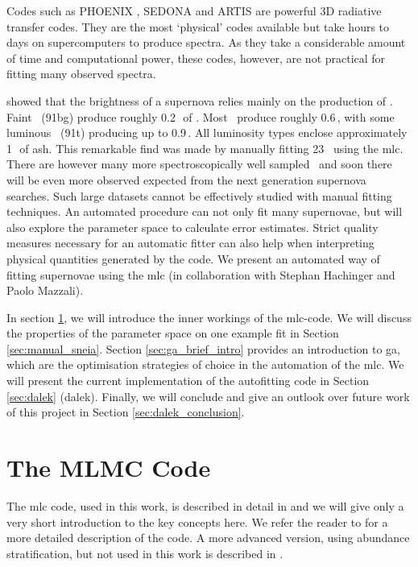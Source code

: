 Codes such as PHOENIX \cite{1999JCoAM.109...41H}, SEDONA \cite{2006ApJ...651..366K} and ARTIS \cite{2009MNRAS.398.1809K} are powerful 3D radiative transfer codes. They are the most `physical' codes available but take hours to days on supercomputers to produce spectra. As they take a considerable amount of time and computational power, these codes, however, are not practical for fitting many observed spectra.

 \cite{2007Sci...315..825M} showed that the brightness of a supernova relies mainly on the production of \Ni. Faint \sneia\ (\gls{91bg}) produce roughly 0.2\,\msun\ of \Ni. Most \sneia\ produce roughly 0.6\,\msun, with some luminous \sneia\ (\gls{91t}) producing up to 0.9\,\msun. All luminosity types enclose approximately 1\,\msun\ of ash. This remarkable find was made by manually fitting 23 \sneia\ using the \gls{mlc}. There are however many more spectroscopically well sampled \sneia\ and soon there will be even more observed expected from the next generation supernova searches. Such large datasets cannot be effectively studied with manual fitting techniques. An automated procedure can not only fit many supernovae, but will also explore the parameter space to calculate error estimates. Strict quality measures necessary for an automatic fitter can also help when interpreting physical quantities generated by the code. We present an automated way of fitting supernovae using the  \gls{mlc} (in collaboration with Stephan Hachinger and Paolo Mazzali).

In section \ref{sec:mlc_intro}, we will introduce the inner workings of the \gls{mlc}-code.  We will discuss the properties of the parameter space on one example fit in Section \ref{sec:manual_sneia}. Section \ref{sec:ga_brief_intro} provides an introduction to \gls{ga}, which are the optimisation strategies of choice in the automation of the \gls{mlc}.  We will present the current implementation of the autofitting code in Section \ref{sec:dalek} (\gls{dalek}).  Finally, we will conclude and give an outlook over future work of this project in Section \ref{sec:dalek_conclusion}.

\section{The MLMC Code}
\label{sec:mlc_intro}

The \gls{mlc} code, used in this work, is described in detail in \citet{2000A&A...363..705M} and we will give only a very short introduction to the key concepts here. We refer the reader to \citet{2000A&A...363..705M} for a more detailed description of the code. A more advanced version, using abundance stratification, but not used in this work  is described in \citet{2000A&A...363..705M}. 

